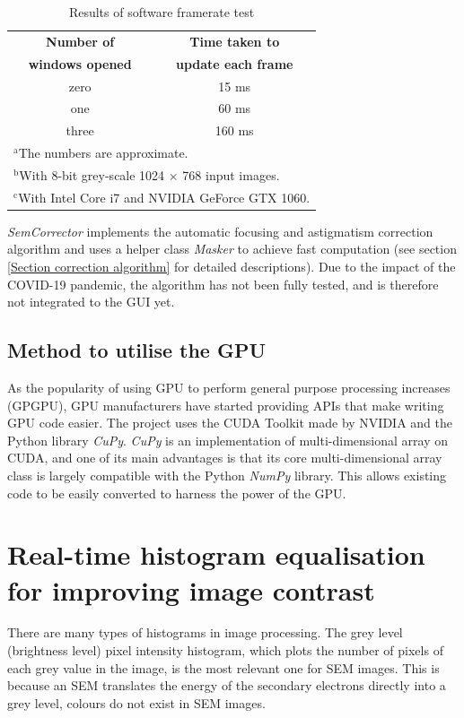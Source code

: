 \documentclass[12pt, conference]{IEEEtran}
\begin{document}
\begin{table}[htbp]
    \caption{Results of software framerate test}
    \begin{center}
    \begin{tabular}{|c|c|}
    \hline
    \textbf{Number of} & \textbf{Time taken to} \\
    \textbf{windows opened} & \textbf{update each frame} \\
    \hline
    zero & 15 ms \\
    \hline
    one & 60 ms \\
    \hline
    three & 160 ms \\
    \hline
    \multicolumn{2}{l}{$^{\mathrm{a}}$The numbers are approximate.} \\
    \multicolumn{2}{l}{$^{\mathrm{b}}$With 8-bit grey-scale 1024 $\times$ 768 input images.} \\
    \multicolumn{2}{l}{$^{\mathrm{c}}$With Intel Core i7 and NVIDIA GeForce GTX 1060.}
    \end{tabular}
    \label{Software framerates}
    \end{center}
\end{table}

\textit{SemCorrector} implements the automatic focusing and astigmatism correction algorithm and uses a helper class \textit{Masker} to achieve fast computation (see section \ref{Section correction algorithm} for detailed descriptions). Due to the impact of the COVID-19 pandemic, the algorithm has not been fully tested, and is therefore not integrated to the GUI yet.

\subsection{Method to utilise the GPU}
As the popularity of using GPU to perform general purpose processing increases (GPGPU), GPU manufacturers have started providing APIs that make writing GPU code easier. The project uses the CUDA Toolkit made by NVIDIA and the Python library \textit{CuPy}. \textit{CuPy} is an implementation of multi-dimensional array on CUDA, and one of its main advantages is that its core multi-dimensional array class is largely compatible with the Python \textit{NumPy} library. This allows existing code to be easily converted to harness the power of the GPU.

\section{Real-time histogram equalisation for improving image contrast}
\label{Section histogram equalisation}
There are many types of histograms in image processing. The grey level (brightness level) pixel intensity histogram, which plots the number of pixels of each grey value in the image, is the most relevant one for SEM images. This is because an SEM translates the energy of the secondary electrons directly into a grey level, colours do not exist in SEM images.
\end{document}
